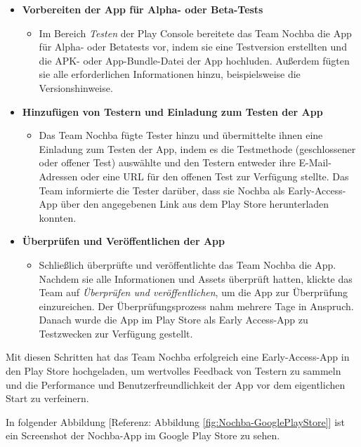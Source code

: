 \begin{itemize}
    \item \textbf{Vorbereiten der App für Alpha- oder Beta-Tests}
          \begin{itemize}
              \item {Im Bereich \textit{Testen} der Play Console bereitete das Team Nochba die App für Alpha- oder Betatests vor, indem sie eine Testversion erstellten und die APK- oder App-Bundle-Datei der App hochluden. Außerdem fügten sie alle erforderlichen Informationen hinzu, beispielsweise die Versionshinweise.}
          \end{itemize}
    \item \textbf{Hinzufügen von Testern und Einladung zum Testen der App}
          \begin{itemize}
              \item {Das Team Nochba fügte Tester hinzu und übermittelte ihnen eine Einladung zum Testen der App, indem es die Testmethode (geschlossener oder offener Test) auswählte und den Testern entweder ihre E-Mail-Adressen oder eine URL für den offenen Test zur Verfügung stellte. Das Team informierte die Tester darüber, dass sie Nochba als Early-Access-App über den angegebenen Link aus dem Play Store herunterladen konnten.}
          \end{itemize}
    \item \textbf{Überprüfen und Veröffentlichen der App}
          \begin{itemize}
              \item {Schließlich überprüfte und veröffentlichte das Team Nochba die App. Nachdem sie alle Informationen und Assets überprüft hatten, klickte das Team auf \textit{Überprüfen und veröffentlichen}, um die App zur Überprüfung einzureichen. Der Überprüfungsprozess nahm mehrere Tage in Anspruch. Danach wurde die App im Play Store als Early Access-App zu Testzwecken zur Verfügung gestellt.}
          \end{itemize}
\end{itemize}

Mit diesen Schritten hat das Team Nochba erfolgreich eine Early-Access-App in den Play Store hochgeladen, um wertvolles Feedback von Testern zu sammeln und die Performance und Benutzerfreundlichkeit der App vor dem eigentlichen Start zu verfeinern.

In folgender Abbildung [Referenz: Abbildung \ref{fig:Nochba-GooglePlayStore}] ist ein Screenshot der Nochba-App im Google Play Store zu sehen.


